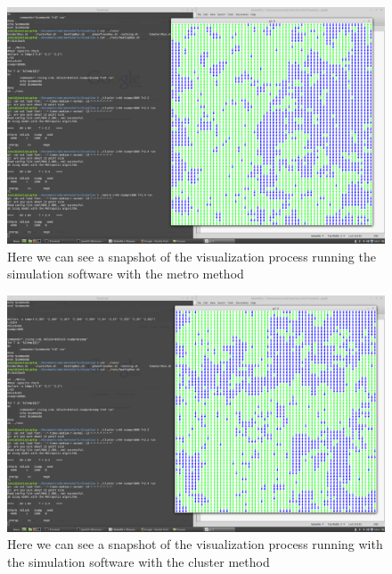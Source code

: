 \documentclass[11pt]{article}
\begin{document}
\begin{figure}[H]
	\centering
	\includegraphics[width=1\textwidth]{../../plots/metroVisualization}
	\caption{Here we can see a snapshot of the visualization process running the simulation software with the metro method}
	\label{fig:metroVisualization}
\end{figure}

\begin{figure}[H]
	\centering
	\includegraphics[width=1\textwidth]{../../plots/clusterVisualization}
	\caption{Here we can see a snapshot of the visualization process running with the simulation software with the cluster method}
	\label{fig:clusterVisualization}
\end{figure}
\end{document}
